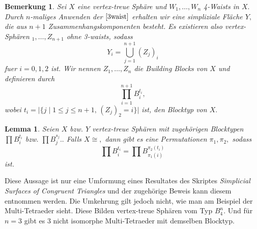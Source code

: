 \documentclass[12pt,titlepage,twoside,cleardoublepage]{article}
\theoremstyle{nummermitklammern}
\newtheorem{lemma}[temp]{Lemma}
\newtheorem{bemerkung}[temp]{Bemerkung}
\newtheorem{lemma}[zahl]{Lemma}
\newtheorem{bemerkung}[zahl]{Bemerkung}
\numberwithin{equation}{section}
\begin{document}
\begin{bemerkung}
Sei $X$ eine vertex-treue Sphäre und $W_1,\ldots,W_n$ 4-Waists in $X.$ Durch  $n$-maliges Anwenden der $\Cref{3waist}$ erhalten wir eine simpliziale Fläche $Y,$ die aus $n+1$ Zusammenhangskomponenten besteht. Es existieren also vertex-Sphären $_1,\ldots,Z_{n+1}$ ohne 3-waists, sodass
\[
Y_i=\bigcup_{j=1}^{n+1}(Z_j)_i 
\]
fuer $i=0,1,2$ ist. Wir nennen $Z_1,\ldots,Z_n$ die Building Blocks von $X$ und definieren durch 
\[
\prod_{i=1}^{n+1} B_i^{t_i},
\]
wobei $t_i=\vert\{j \mid 1\leq j\leq n+1,\,(Z_j)_2=i\}\vert$ ist, den \emph{Blocktyp} von $X.$
\end{bemerkung}
\begin{lemma}
Seien $X$ bzw. $Y$ vertex-treue Sphären mit zugehörigen Blocktypen $\prod B_i^{t_i}$ bzw. $\prod B_j^{s_j}..$ Falls $X\cong,$ dann gibt es eine Permutationen $\pi_1,\pi_2,$ sodass 
\[
\prod B_i^{t_i}=\prod B_{\pi_1(i)}^{\pi_2(t_i)}
\]  
ist.
\end{lemma}
Diese Aussage ist nur eine Umformung eines Resultates des Skriptes \emph{Simplicial Surfaces of Congruent Triangles} und der zugehörige Beweis kann diesem entnommen werden. Die Umkehrung gilt jedoch nicht, wie man am Beispiel der Multi-Tetraeder sieht. Diese Bilden vertex-treue Sphären vom Typ $B_4^n.$ Und für $n=3$ gibt es 3 nicht isomorphe Multi-Tetraeder mit demselben Blocktyp.  
\end{document}
